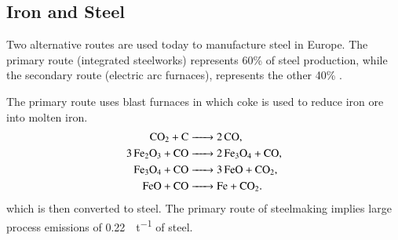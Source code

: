 





\subsection{Iron and Steel}
\label{sec:si:industry:steel}

Two alternative routes are used today to manufacture steel in Europe. The
primary route (integrated steelworks) represents 60\% of steel production, while
the secondary route (electric arc furnaces), represents the other 40\%
.

The primary route uses blast furnaces in which coke is used to reduce iron ore
into molten iron.
\begin{align}
    \ce{CO2 + C &-> 2CO}, \\
    \ce{3Fe2O3 + CO &-> 2Fe3O4 + CO}, \\
    \ce{Fe3O4 + CO &-> 3FeO + CO2}, \\
    \ce{FeO + CO &-> Fe + CO2}.
\end{align}
which is then converted to steel. The primary route of steelmaking implies large
process emissions of \SI{0.22}{\tco\per\tonne} of steel.

